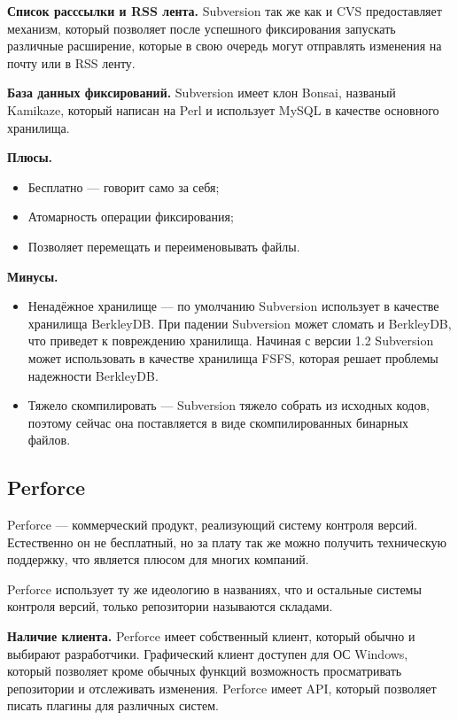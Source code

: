 \textbf{Список расссылки и RSS лента.} Subversion так же как и CVS предоставляет механизм, который позволяет после успешного фиксирования запускать различные расширение, которые в свою очередь могут отправлять изменения на почту или в RSS ленту.

\textbf{База данных фиксирований.} Subversion имеет клон Bonsai, названый Kamikaze, который написан на Perl и использует MySQL в качестве основного хранилища.

\textbf{Плюсы.}
\begin{itemize}
\item Бесплатно --- говорит само за себя;
\item Атомарность операции фиксирования;
\item Позволяет перемещать и переименовывать файлы.
\end{itemize}


\textbf{Минусы.}
\begin{itemize}
\item Ненадёжное хранилище --- по умолчанию Subversion использует в качестве хранилища BerkleyDB. При падении Subversion может сломать и BerkleyDB, что приведет к повреждению хранилища. Начиная с версии 1.2 Subversion может использовать в качестве хранилища FSFS, которая решает проблемы надежности BerkleyDB.

\item Тяжело скомпилировать --- Subversion тяжело собрать из исходных кодов, поэтому сейчас она поставляется в виде скомпилированных бинарных файлов.
\end{itemize}


\subsection{ Perforce } \label{sect3_4_4}

Perforce --- коммерческий продукт, реализующий систему контроля версий. Естественно он не бесплатный, но за плату так же можно получить техническую поддержку, что является плюсом для многих компаний.

Perforce использует ту же идеологию в названиях, что и остальные системы контроля версий, только репозитории называются складами.


\textbf{Наличие клиента.} Perforce имеет собственный клиент, который обычно и выбирают разработчики. Графический клиент доступен для ОС Windows, который позволяет кроме обычных функций возможность просматривать репозитории и отслеживать изменения. Perforce имеет API, который позволяет писать плагины для различных систем.

